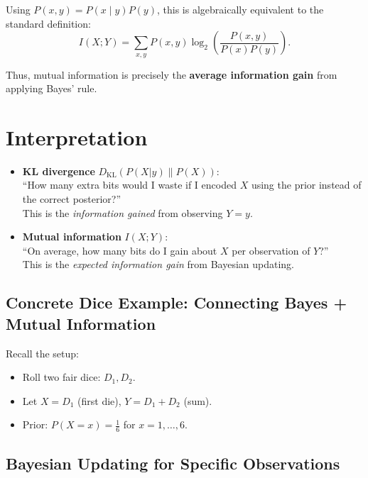 \documentclass[11pt]{article}
\begin{document}
Using \(P(x,y) = P(x \mid y) P(y)\), this is algebraically equivalent to the standard definition:
\[
I(X;Y) = \sum_{x,y} P(x,y) \log_2 \left( \frac{P(x,y)}{P(x) P(y)} \right).
\]

Thus, mutual information is precisely the \textbf{average information gain} from applying Bayes' rule.

\section*{Interpretation}


\begin{itemize}
    \item \textbf{KL divergence} \(D_{\mathrm{KL}}(P(X|y) \| P(X))\): \\
    ``How many extra bits would I waste if I encoded \(X\) using the prior instead of the correct posterior?'' \\
    This is the \emph{information gained} from observing \(Y = y\).

    \item \textbf{Mutual information} \(I(X;Y)\): \\
    ``On average, how many bits do I gain about \(X\) per observation of \(Y\)?'' \\
    This is the \emph{expected information gain} from Bayesian updating.
\end{itemize}

\subsection{Concrete Dice Example: Connecting Bayes + Mutual Information}

Recall the setup:
\begin{itemize}
\item Roll two fair dice: \(D_1, D_2\).
    \item Let \(X = D_1\) (first die), \(Y = D_1 + D_2\) (sum).
    \item Prior: \(P(X = x) = \frac{1}{6}\) for \(x = 1,\dots,6\).
\end{itemize}






\subsection*{Bayesian Updating for Specific Observations}
\end{document}
